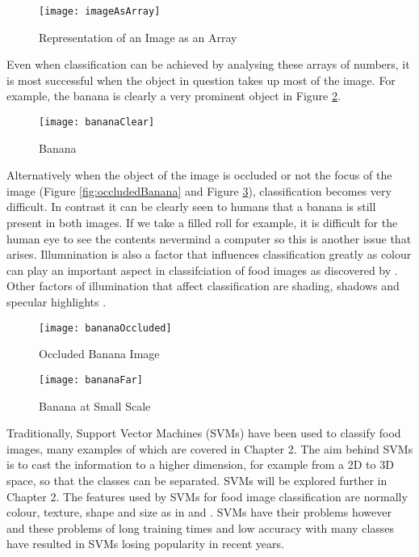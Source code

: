 \begin{figure}[h]
	\centering
	\texttt{[image: imageAsArray]}
	\caption{Representation of an Image as an Array}
	\label{fig:imageArray}
\end{figure}

Even when classification can be achieved by analysing these arrays of numbers, it is most successful when the object in question takes up most of the image.
For example, the banana is clearly a very prominent object in Figure \ref{fig:bananaClear}.

\begin{figure}[h]
  \centering
	\texttt{[image: bananaClear]}
	\caption{Banana}
	\label{fig:bananaClear}
\end{figure}

Alternatively when the object of the image is occluded or not the focus of the image (Figure \ref{fig:occludedBanana} and Figure \ref{fig:farBanana}), classification becomes very difficult.
In contrast it can be clearly seen to humans that a banana is still present in both images.
If we take a filled roll for example, it is difficult for the human eye to see the contents nevermind a computer so this is another issue that arises.
Illumnination is also a factor that influences classification greatly as colour can play an important aspect in classifciation of food images as discovered by \parencite{novelSVM}.
Other factors of illumination that affect classification are shading, shadows and specular highlights \parencite{dynamicGong}.

\begin{figure}[h] 
  \label{ fig7} 
  \begin{minipage}[h]{0.5\linewidth}
    \centering
    \texttt{[image: bananaOccluded]} 
    \caption{Occluded Banana Image} 
  \label{fig:occludedBanana}
    \vspace{4ex}
  \end{minipage}%
  \begin{minipage}[h]{0.5\linewidth}
    \centering
    \texttt{[image: bananaFar]} 
    \caption{Banana at Small Scale} 
  \label{fig:farBanana}
    \vspace{4ex}
  \end{minipage} 
\end{figure}

Traditionally, Support Vector Machines (SVMs) have been used to classify food images, many examples of which are covered in Chapter 2.
The aim behind SVMs is to cast the information to a higher dimension, for
example from a 2D to 3D space, so that the classes can be separated. SVMs will be explored further in Chapter 2.
The features used by SVMs for food image classification are normally colour, texture, shape and size as in \parencite{pouladzadeh2014measuring} and \parencite{novelSVM}.
SVMs have their problems however and these problems of long training times and low accuracy with many classes have resulted in SVMs losing popularity in recent years.

